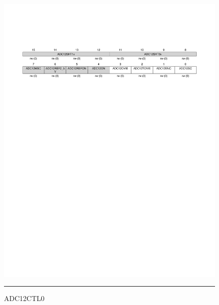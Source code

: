 \begin{figure}[H]
  \centering
  \includegraphics [angle=0, width=16cm]{./Figures/Chap11_ADC/ADC12CTL0.pdf}
  \rule{35em}{0.5pt}
  \caption{ADC12CTL0}
  \label{fig:ADC12CTL0}
\end{figure}

